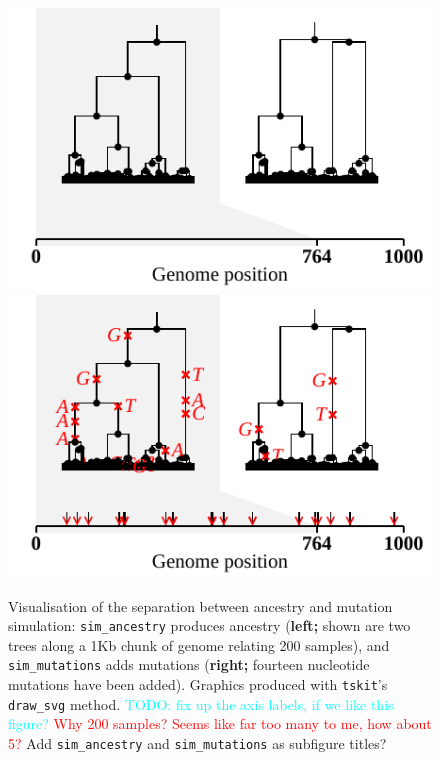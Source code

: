\documentclass{article}
\newcommand{\tskit}[0]{\texttt{tskit}}
\newcommand{\jkcomment}[1]{\textcolor{red}{#1}}
\newcommand{\plrcomment}[1]{\textcolor{cyan}{#1}}
\newcommand{\grgcomment}[1]{\textcolor{yellow!60!red}{#1}}
\begin{document}
\begin{figure}
    \includegraphics{illustrations/unmutated_tree}
    \includegraphics{illustrations/mutated_tree}
    \caption{
        \label{fig-mutated-trees}
        Visualisation of the separation between ancestry and mutation simulation:
        \texttt{sim\_ancestry} produces ancestry
        (\textbf{left;} shown are two trees along a 1Kb chunk of genome
        relating 200 samples),
        and \texttt{sim\_mutations} adds mutations
        (\textbf{right;} fourteen nucleotide mutations have been added).
        Graphics produced with \tskit's \texttt{draw\_svg} method.
        \plrcomment{TODO: fix up the axis labels, if we like this figure?}
        \jkcomment{Why 200 samples? Seems like far too many to me, how about 5?}
        \grgcomment{Add \texttt{sim\_ancestry} and \texttt{sim\_mutations} as subfigure titles?}
    }
\end{figure}
\end{document}
